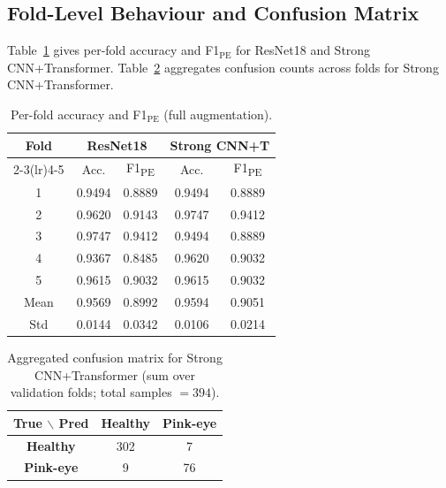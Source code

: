 \documentclass[10pt,journal,compsoc]{IEEEtran}
\begin{document}
\subsection{Fold-Level Behaviour and Confusion Matrix}
Table~\ref{tab:per_fold} gives per-fold accuracy and F1$_{\mathrm{PE}}$
for ResNet18 and Strong CNN+Transformer. Table~\ref{tab:confusion}
aggregates confusion counts across folds for Strong CNN+Transformer.

\begin{table}[h]
  \caption{Per-fold accuracy and F1$_{\mathrm{PE}}$ (full augmentation).}
  \label{tab:per_fold}
  \centering
  \begin{tabular}{ccccc}
    \toprule
    \multirow{2}{*}{\textbf{Fold}}
      & \multicolumn{2}{c}{\textbf{ResNet18}}
      & \multicolumn{2}{c}{\textbf{Strong CNN+T}} \\
    \cmidrule(lr){2-3}\cmidrule(lr){4-5}
      & Acc. & F1\textsubscript{PE}
      & Acc. & F1\textsubscript{PE} \\
    \midrule
    1 & 0.9494 & 0.8889 & 0.9494 & 0.8889 \\
    2 & 0.9620 & 0.9143 & 0.9747 & 0.9412 \\
    3 & 0.9747 & 0.9412 & 0.9494 & 0.8889 \\
    4 & 0.9367 & 0.8485 & 0.9620 & 0.9032 \\
    5 & 0.9615 & 0.9032 & 0.9615 & 0.9032 \\
    \midrule
    Mean & 0.9569 & 0.8992 & 0.9594 & 0.9051 \\
    Std  & 0.0144 & 0.0342 & 0.0106 & 0.0214 \\
    \bottomrule
  \end{tabular}
\end{table}

\begin{table}[h]
  \caption{Aggregated confusion matrix for Strong CNN+Transformer (sum over
    validation folds; total samples $=394$).}
  \label{tab:confusion}
  \centering
  \begin{tabular}{ccc}
    \toprule
    \multirow{2}{*}{\textbf{True $\backslash$ Pred}}
      & \textbf{Healthy}
      & \textbf{Pink-eye} \\
    \midrule
    \textbf{Healthy}  & 302 & \phantom{0}7 \\
    \textbf{Pink-eye} & \phantom{0}9 & 76 \\
    \bottomrule
  \end{tabular}
\end{table}
\end{document}
